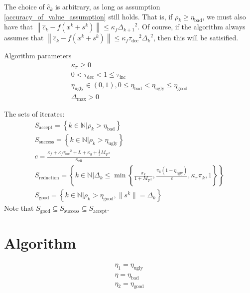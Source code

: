 \documentclass{article}
\theoremstyle{case}
\newcommand{\naturals}{{\mathbb N}}
\newcommand{\xk}{{x^k}}
\newcommand{\dk}{{\Delta_k}}
\newcommand{\rk}{{\rho_k}}
\newcommand{\pik}{{\pi_k}}
\newcommand{\sk}{{s^k}}
\newcommand{\lip}{{L}}
\newcommand{\dkpo}{{\Delta_{k+1}}}
\newcommand{\ctrialk}{{\hat c_k}}
\newcommand{\kappaf}{{\kappa_{f}}}
\newcommand{\kappag}{{\kappa_{g}}}
\newcommand{\maxhes}{{M_{\nabla^2}}}
\newcommand{\kcrit}{{\kappa_{\pi}}}
\newcommand{\tinc}{{\tau_{\text{inc}}}}
\newcommand{\tdec}{{\tau_{\text{dec}}}}
\newcommand{\egood}{{\eta_{\text{good}}}}
\newcommand{\eugly}{{\eta_{\text{ugly}}}}
\newcommand{\ebad}{{\eta_{\text{bad}}}}
\newcommand{\accepting}{{S_{\text{accept}}}}
\newcommand{\success}{{S_{\text{success}}}}
\newcommand{\super}{{S_{\text{good}}}}
\newcommand{\sriter}{{S_{\text{reduction}}}}
\newcommand{\keff}{{\kappa_{\text{eff}}}}
\newcommand{\dmax}{{\Delta_{\text{max}}}}
\begin{document}
The choice of $\ctrialk$ is arbitrary, as long as assumption \cref{accuracy_of_value_assumption} still holds.
That is, if $\rk \ge \ebad$, we must also have that $\left\|\ctrialk - f(\xk + \sk) \right\| \le \kappaf \dkpo^2$.
Of course, if the algorithm always assumes that  $\left\|\ctrialk - f(\xk + \sk) \right\| \le \kappaf \tdec^2 \dk^2$,
then this will be satisified.

Algorithm parameters
\begin{align}
\kcrit \ge 0 \label{define_kcrit} \\
0 < \tdec < 1 \le \tinc \label{define_tr_manipulators} \\
\eugly \in (0, 1), 0 \le \ebad < \eugly \le \egood \label{define_good_bad_ugly} \\
\dmax > 0 \label{define_dmax}
\end{align}


The sets of iterates:
\begin{align}
\accepting = \left\{ k \in \naturals | \rk > \ebad \right\} \label{define_accepting} \\
\success = \left\{ k \in \naturals | \rk > \eugly \right\} \label{define_successful} \\
c = \frac {\kappaf + \kappaf\tinc^2 + \lip + \kappag + \frac 1 2 \maxhes}{\keff} \label{define_c}\\
\sriter = \left\{ k \in \naturals | \dk \le \min\left\{\frac{\pik}{1 + \maxhes}, \frac{\pik\left(1 - \eugly\right)}{c}, \kcrit\pik, 1 \right\}\right\} \label{define_sriter} \\
\super = \left\{ k \in \naturals | \rk > \egood, \|\sk\| = \dk \right\} \label{define_super}
\end{align}
Note that $\super \subseteq \success \subseteq \accepting$.


\section{Algorithm}

\begin{align*}
\eta_1 = \eugly \\
\eta = \ebad \\
\eta_2 = \egood
\end{align*}
\end{document}

